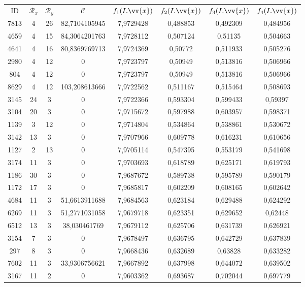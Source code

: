 \scriptsize
\begin{longtable}{|c|c|c|c|c|c|c|c|}
\hline
ID & $\mathscr{R}_x$ & $\mathscr{R}_y$ & $\mathscr{C}$ & $f_1(I.\vv{x})$ & $f_2(I.\vv{x})$ & $f_3(I.\vv{x})$ & $f_4(I.\vv{x})$ \\
7813 & 4 & 26 & 82,7104105945 & 7,9729428 & 0,488853 & 0,492309 & 0,484956 \\
4659 & 4 & 15 & 84,3064201763 & 7,9728112 & 0,507124 & 0,51135 & 0,504663 \\
4641 & 4 & 16 & 80,8369769713 & 7,9724369 & 0,50772 & 0,511933 & 0,505276 \\
2980 & 4 & 12 & 0 & 7,9723797 & 0,50949 & 0,513816 & 0,506966 \\
804 & 4 & 12 & 0 & 7,9723797 & 0,50949 & 0,513816 & 0,506966 \\
8629 & 4 & 12 & 103,208613666 & 7,9722562 & 0,511167 & 0,515464 & 0,508693 \\
3145 & 24 & 3 & 0 & 7,9722366 & 0,593304 & 0,599433 & 0,59397 \\
3104 & 20 & 3 & 0 & 7,9715672 & 0,597988 & 0,603957 & 0,598371 \\
1139 & 3 & 12 & 0 & 7,9714804 & 0,534864 & 0,538861 & 0,530672 \\
3142 & 13 & 3 & 0 & 7,9707966 & 0,609778 & 0,616231 & 0,610656 \\
1127 & 2 & 13 & 0 & 7,9705114 & 0,547395 & 0,553179 & 0,541698 \\
3174 & 11 & 3 & 0 & 7,9703693 & 0,618789 & 0,625171 & 0,619793 \\
1186 & 30 & 3 & 0 & 7,9687672 & 0,589738 & 0,595789 & 0,590179 \\
1172 & 17 & 3 & 0 & 7,9685817 & 0,602209 & 0,608165 & 0,602642 \\
4684 & 11 & 3 & 51,6613911688 & 7,9684563 & 0,623184 & 0,629488 & 0,624292 \\
6269 & 11 & 3 & 51,2771031058 & 7,9679718 & 0,623351 & 0,629652 & 0,62448 \\
6512 & 13 & 3 & 38,030461769 & 7,9679112 & 0,625706 & 0,631739 & 0,626921 \\
3154 & 7 & 3 & 0 & 7,9678497 & 0,636795 & 0,642729 & 0,637839 \\
297 & 8 & 3 & 0 & 7,9668436 & 0,632689 & 0,63828 & 0,633282 \\
7602 & 11 & 3 & 33,9306756621 & 7,9667892 & 0,637998 & 0,644072 & 0,639502 \\
3167 & 11 & 2 & 0 & 7,9603362 & 0,693687 & 0,702044 & 0,697779 \\

\end{longtable}
